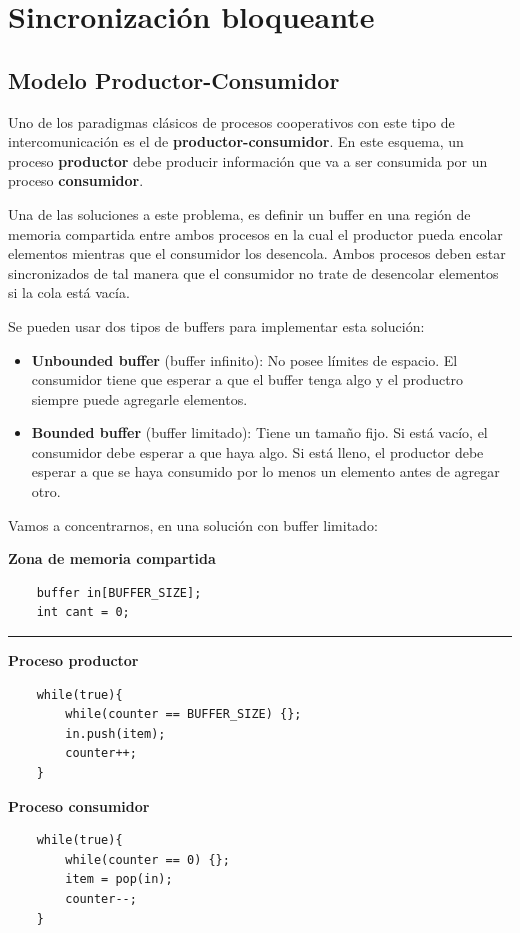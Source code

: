 \section{Sincronización bloqueante}
\subsection{Modelo Productor-Consumidor}
Uno de los paradigmas clásicos de procesos cooperativos con este tipo de intercomunicación es el de \textbf{productor-consumidor}. En este esquema, un proceso \textbf{productor} debe producir información que va a ser consumida por un proceso \textbf{consumidor}.

Una de las soluciones a este problema, es definir un buffer en una región de memoria compartida entre ambos procesos en la cual el productor pueda encolar elementos mientras que el consumidor los desencola. Ambos procesos deben estar sincronizados de tal manera que el consumidor no trate de desencolar elementos si la cola está vacía.

Se pueden usar dos tipos de buffers para implementar esta solución:
\begin{itemize}
	\item \textbf{Unbounded buffer} (buffer infinito): No posee límites de espacio. El consumidor tiene que esperar a que el buffer tenga algo y el productro siempre puede agregarle elementos.
	\item \textbf{Bounded buffer} (buffer limitado): Tiene un tamaño fijo. Si está vacío, el consumidor debe esperar a que haya algo. Si está lleno, el productor debe esperar a que se haya consumido por lo menos un elemento antes de agregar otro.
\end{itemize}

Vamos a concentrarnos, en una solución con buffer limitado:

\vspace*{0.25cm}
\begin{center}
		\textbf{Zona de memoria compartida}
	\begin{verbatim}
	buffer in[BUFFER_SIZE];
	int cant = 0;
	\end{verbatim}
\end{center}
\setlength{\columnseprule}{0.4pt}
\noindent\rule{\textwidth}{0.4pt}
\begin{multicols}{2}
	\begin{center}
	\textbf{Proceso productor}

	\begin{verbatim}
	while(true){
		while(counter == BUFFER_SIZE) {};
		in.push(item);
		counter++;
	}
	\end{verbatim}
\columnbreak
\textbf{Proceso consumidor}
	\begin{verbatim}
	while(true){
		while(counter == 0) {};
		item = pop(in);
		counter--;
	}
	\end{verbatim}
	\end{center}
\end{multicols}
\setlength{\columnseprule}{0pt}

